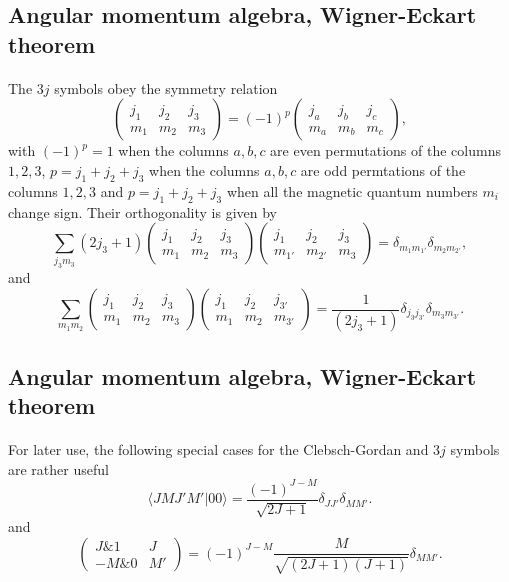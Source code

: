 \documentclass[%
twoside,                 %
final,                   %
10pt]{article}
\begin{document}
\subsection*{Angular momentum algebra, Wigner-Eckart theorem}

\paragraph{}
The $3j$ symbols obey the symmetry relation
\[
\left(\begin{array}{ccc}  j_1 & j_2 & j_3 \\ m_1 & m_2 & m_3\end{array}\right)=(-1)^{p}\left(\begin{array}{ccc}  j_a & j_b & j_c \\ m_a & m_b & m_c\end{array}\right),
\]
with $(-1)^p=1$ when the columns $a,b, c$ are even permutations of the columns $1,2,3$, $p=j_1+j_2+j_3$ when the columns $a,b,c$ are odd permtations of the
columns $1,2,3$ and $p=j_1+j_2+j_3$ when all the magnetic quantum numbers $m_i$ change sign. Their orthogonality is given by
\[
\sum_{j_3m_3}(2j_3+1)\left(\begin{array}{ccc}  j_1 & j_2 & j_3 \\ m_1 & m_2 & m_3\end{array}\right)\left(\begin{array}{ccc}  j_1 & j_2 & j_3 \\ m_{1'} & m_{2'} & m_3\end{array}\right)=\delta_{m_1m_{1'}}\delta_{m_2m_{2'}},
\]
and 
\[
\sum_{m_1m_2}\left(\begin{array}{ccc}  j_1 & j_2 & j_3 \\ m_1 & m_2 & m_3\end{array}\right)\left(\begin{array}{ccc}  j_1 & j_2 & j_{3'} \\ m_{1} & m_{2} & m_{3'}\end{array}\right)=\frac{1}{(2j_3+1)}\delta_{j_3j_{3'}}\delta_{m_3m_{3'}}.
\]


\subsection*{Angular momentum algebra, Wigner-Eckart theorem}

\paragraph{}
For later use, the following special cases for the Clebsch-Gordan and $3j$ symbols are rather useful
\[
\langle JM J'M' |00\rangle =\frac{(-1)^{J-M}}{\sqrt{2J+1}}\delta_{JJ'}\delta_{MM'}.
\] 
and 
\[
\left(\begin{array}{ccc}  J {\&} 1 & J \\ -M {\&} 0 & M'\end{array}\right)=(-1)^{J-M}\frac{M}{\sqrt{(2J+1)(J+1)}}\delta_{MM'}.
\]
\end{document}
